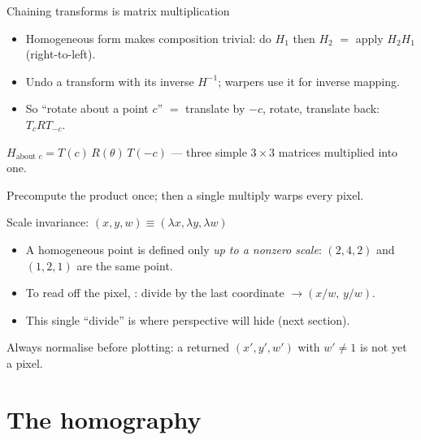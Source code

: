 \documentclass[10pt,aspectratio=169]{beamer}
\begin{document}
\begin{frame}{Chaining transforms is matrix multiplication}
  \begin{itemize}
    \item Homogeneous form makes composition trivial: do $H_1$ then $H_2$ $=$ apply $H_2H_1$ (right-to-left).
    \item Undo a transform with its inverse $H^{-1}$; warpers use it for inverse mapping.
    \item So ``rotate about a point $c$'' $=$ translate by $-c$, rotate, translate back: $T_{c}RT_{-c}$.
  \end{itemize}
  \begin{mathbox}
    $H_{\text{about }c}=T(c)\,R(\theta)\,T(-c)$ — three simple $3\times3$ matrices multiplied into one.
  \end{mathbox}
  \begin{goodbox}
    Precompute the product once; then a single multiply warps every pixel.
  \end{goodbox}
\end{frame}

\begin{frame}{Scale invariance: $(x,y,w)\equiv(\lambda x,\lambda y,\lambda w)$}
  \begin{itemize}
    \item A homogeneous point is defined only \emph{up to a nonzero scale}: $(2,4,2)$ and $(1,2,1)$ are the same point.
    \item To read off the pixel, : divide by the last coordinate $\to (x/w,\,y/w)$.
    \item This single ``divide'' is where perspective will hide (next section).
  \end{itemize}
  \begin{goodbox}
    Always normalise before plotting: a returned $(x',y',w')$ with $w'\neq1$ is not yet a pixel.
  \end{goodbox}
\end{frame}

\section{The homography}
\end{document}
